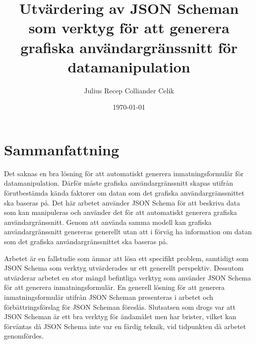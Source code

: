 \documentclass[10pt,a4paper,titlepage,twoside]{report}
\begin{document}
\title{Utvärdering av JSON Scheman som verktyg för att generera grafiska användargränssnitt för datamanipulation}
\author{Julius Recep Colliander Celik}
\date{\today}

\frontmatter


\maketitle
\cleardoublepage
\cleardoublepage

\setlength{\parindent}{0pt}

\setlength{\parskip}{\baselineskip}

\section*{Sammanfattning}
Det saknas en bra lösning för att automatiskt generera inmatningsformulär för datamanipulation. Därför måste grafiska användargränssnitt skapas utifrån förutbestämda kända faktorer om datan som det grafiska användargränssnittet ska baseras på. Det här arbetet använder JSON Schema för att beskriva data som kan manipuleras och använder det för att automatiskt generera grafiska användargränssnitt. Genom att använda samma modell kan grafiska användargränssnitt genereras generellt utan att i förväg ha information om datan som det grafiska användargränssnittet ska baseras på.

Arbetet är en fallstudie som ämnar att lösa ett specifikt problem, samtidigt som JSON Schema som verktyg utvärderades ur ett generellt perspektiv. Dessutom utvärderar arbetet en stor mängd befintliga verktyg som använder JSON Schema för att generera inmatningsformulär. En generell lösning för att generera inmatningsformulär utifrån JSON Scheman presenteras i arbetet och förbättringsförslag för JSON Scheman föreslås. Slutsatsen som drogs var att JSON Scheman är ett bra verktyg för ändamålet men har brister, vilket kan förväntas då JSON Schema inte var en färdig teknik, vid tidpunkten då arbetet genomfördes.

\clearpage
\end{document}

